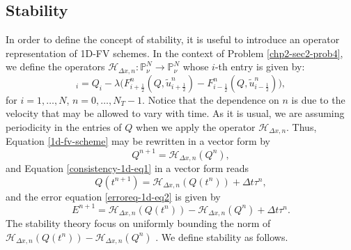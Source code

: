 \subsection{Stability}
\label{chp2-sub-stability}
In order to define the concept of stability, it is useful to introduce an operator
representation of 1D-FV schemes.
In the context of Problem \ref{chp2-sec2-prob4}, we define the operators
$\mathcal{H}_{\Delta x,n}: \mathbb{P}^{N}_{\nu} \to \mathbb{P}^{N}_{\nu}$ whose $i$-th entry is given by:
\begin{equation}
	[\mathcal{H}_{\Delta x,n}(Q)]_i = Q_i -
	\lambda \bigg({F}^n_{i+\frac{1}{2}}(Q,\tilde{u}^n_{i+\frac{1}{2}}) 
	- {F}^n_{i-\frac{1}{2}}(Q,\tilde{u}^n_{i-\frac{1}{2}}) \bigg),
\end{equation}
for $i=1, \ldots, N$, $n=0, \ldots, N_T-1$.
Notice that the dependence on $n$ is due to the velocity that may be allowed
to vary with time.
As it is usual, we are assuming periodicity in the entries of $Q$ when 
we apply the operator $\mathcal{H}_{\Delta x,n}$.
Thus, Equation \eqref{1d-fv-scheme} may be rewritten in a vector form by
\begin{equation*}
	Q^{n+1} = \mathcal{H}_{\Delta x,n}(Q^n),
\end{equation*}
and Equation \eqref{consistency-1d-eq1} in a vector form reads
\begin{equation*}
	Q(t^{n+1}) = \mathcal{H}_{\Delta x,n}(Q(t^n)) + \Delta t \tau^n,
\end{equation*}
and the error equation \eqref{erroreq-1d-eq2} is given by
\begin{equation}
	\label{erroreq-1d-eq3}
	E^{n+1} = \mathcal{H}_{\Delta x,n}(Q(t^n)) - \mathcal{H}_{\Delta x,n}(Q^n) +  \Delta t \tau^n.
\end{equation}
The stability theory focus on uniformly bounding the norm of $\mathcal{H}_{\Delta x,n}(Q(t^n)) - \mathcal{H}_{\Delta x,n}(Q^n)$ \citep{leveque:2002}.
We define stability as follows.


